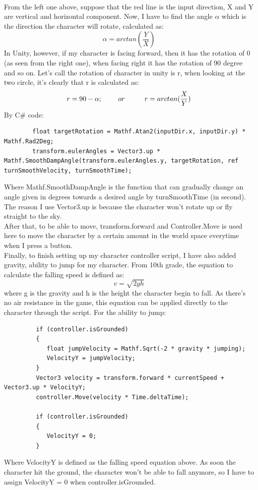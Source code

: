 \documentclass[a4paper, 13pt]{extarticle}
\begin{document}
 	 	\\[0.02cm]
 	 	From the left one above, suppose that the red line is the input direction, X and Y are vertical and horizontal component. Now, I have to find the angle {$\alpha$} which is the direction the character will rotate, calculated as: 
 	 	\\[-0.5cm]
 	 	\[\alpha = arctan(\frac{Y}{X})\]
 	 	In Unity, however, if my character is facing forward, then it has the rotation of 0 (as seen from the right one), when facing right it has the rotation of 90 degree and so on. Let's call the rotation of character in unity is r, when looking at the two circle, it's clearly that r is calculated as: \\[-0.5cm]
 	 	 \[r = 90 - \alpha; \hspace{0.8cm} or \hspace{1.0cm} r = arctan(\frac{X}{Y})\] 
 	 	By C\# code:
 	 	\begin{lstlisting}
 	 	float targetRotation = Mathf.Atan2(inputDir.x, inputDir.y) * Mathf.Rad2Deg;
 	 	transform.eulerAngles = Vector3.up * Mathf.SmoothDampAngle(transform.eulerAngles.y, targetRotation, ref turnSmoothVelocity, turnSmoothTime);
 	 	\end{lstlisting}
 	 	
 	 	Where Mathf.SmoothDampAngle is the function that can gradually change an angle given in degrees towards a desired angle by turnSmoothTime (in second). The reason I use Vector3.up is because the character won't rotate up or fly straight to the sky.  \\[0.15cm] After that, to be able to move, transform.forward and Controller.Move is used here to move the character by a certain amount in the world space everytime when I press a button. \\[0.15cm] Finally, to finish setting up my character controller script, I have also added gravity, ability to jump for my character. From 10th grade, the equation to calculate the falling speed is defined as: 
 	 	\\[-0.5cm]
 	 	 \[v = \sqrt{2gh}\]
 	 	 where g is the gravity and h is the height the character begin to fall. As there's no air resistance in the game, this equation can be applied directly to the character through the script. For the ability to jump:
 	 	 \begin{lstlisting}
 	 	 if (controller.isGrounded)
 	 	 {
 	 	 	float jumpVelocity = Mathf.Sqrt(-2 * gravity * jumping);
 	 	 	VelocityY = jumpVelocity;
 	 	 }
 	 	 Vector3 velocity = transform.forward * currentSpeed + Vector3.up * VelocityY;
 	 	 controller.Move(velocity * Time.deltaTime);
 	 	 
 	 	 if (controller.isGrounded)
 	 	 {
 	 	 	VelocityY = 0;  
 	 	 }
 	 	 \end{lstlisting}
 	 	 Where VelocityY is defined as the falling speed equation above. As soon the character hit the ground, the character won't be able to fall anymore, so I have to assign VelocityY = 0 when controller.isGrounded. 
\end{document}

